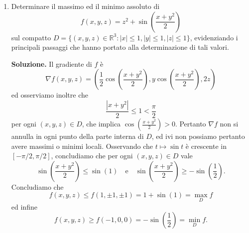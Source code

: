 \begin{enumerate}
	\textbf{Soluzione.}
		Calcoliamo le derivate parziali in $\operatorname{Int} E \subset \mathbb{R}^3$, ovvero
		\[
		\frac{\partial f}{\partial x} = 2x e^{x^2 + y^2 + z^2} \cos\left(e^{x^2 + y^2 + z^2}\right), \quad
		\frac{\partial f}{\partial y} = 2y e^{x^2 + y^2 + z^2} \cos\left(e^{x^2 + y^2 + z^2}\right),
		\]
		e $\frac{\partial f}{\partial z} = 2z e^{x^2 + y^2 + z^2} \cos\left(e^{x^2 + y^2 + z^2}\right)$. Per $(x,y,z) \in E$, vale
		\[
		1 \leq e^{x^2 + y^2 + z^2} \leq e^{\log(3\pi/4)} = \frac{3\pi}{4}.
		\]
		L'immagine di $E$ tramite $e^{x^2 + y^2 + z^2}$ è esattamente l'intervallo $[1, 3\pi/4]$. Quindi è sufficiente studiare $\sin(x)$ in tale intervallo. Notiamo che
		\[
		\frac{\pi}{4} < 1 < \frac{\pi}{2}
		\]
		e $\sin(x)$ è crescente in $[0, \pi/2]$, pertanto
		\[
		\sin\left(\frac{3\pi}{4}\right) = \sin\left(\frac{\pi}{4}\right) < \sin(1) < \sin\left(\frac{\pi}{2}\right) = 1.
		\]
		Quindi tutti i punti della sfera $\operatorname{Fr}(B(0, \sqrt{\log(\pi/2)}))$ sono di massimo assoluto per
		\[
		f(x,y,z) = \sin\left(e^{x^2 + y^2 + z^2}\right) \quad \text{su} \quad E
		\]
		ed infatti in tali punti, che sono interni ad $E$, il gradiente di $f$ si annulla. L'unico altro punto dove si annulla il gradiente è l'origine, che è un minimo locale in quanto
		\[
		f(0,0,0) = \sin(1) \leq \sin\left(e^{x^2 + y^2 + z^2}\right)
		\]
		per $(x,y,z) \in B(0, \sqrt{\log(\pi/2)})$. Per le disuguaglianze di~(1), il minimo assoluto è assunto nei punti di $\operatorname{Fr}(B(0, \sqrt{\log(3\pi/4)})) = \operatorname{Fr}(E)$. Abbiamo infine
		\[
		f(E) = \left[\frac{1}{\sqrt{2}}, 1\right].
		\]
		Si osservi che per avere immagine, minimi e massimi locali e globali bastava studiare la funzione
		\[
		\varphi(s) = \sin\left(e^s\right)
		\]
		sull'intervallo $\left[0, \log\left(\frac{3\pi}{4}\right)\right]$.

	
	\item Determinare il massimo ed il minimo assoluto di
	\[
	f(x,y,z) = z^2 + \sin\left(\frac{x + y^2}{2}\right)
	\]
	sul compatto $D = \{(x,y,z) \in \mathbb{R}^3 : |x| \leq 1, |y| \leq 1, |z| \leq 1\}$, evidenziando i principali passaggi che hanno portato alla determinazione di tali valori.

	\textbf{Soluzione.}
		Il gradiente di $f$ è
		\[
		\nabla f(x,y,z) = \left(\frac{1}{2} \cos\left(\frac{x + y^2}{2}\right), y \cos\left(\frac{x + y^2}{2}\right), 2z\right)
		\]
		ed osserviamo inoltre che
		\[
		\frac{|x + y^2|}{2} \leq 1 < \frac{\pi}{2}
		\]
		per ogni $(x,y,z) \in D$, che implica $\cos\left(\frac{x + y^2}{2}\right) > 0$. Pertanto $\nabla f$ non si annulla in ogni punto della parte interna di $D$, ed ivi non possiamo pertanto avere massimi o minimi locali. Osservando che $t \mapsto \sin t$ è crescente in $[-\pi/2, \pi/2]$, concludiamo che per ogni $(x,y,z) \in D$ vale
		\[
		\sin\left(\frac{x + y^2}{2}\right) \leq \sin(1) \quad \text{e} \quad \sin\left(\frac{x + y^2}{2}\right) \geq -\sin\left(\frac{1}{2}\right).
		\]
		Concludiamo che
		\[
		f(x,y,z) \leq f(1, \pm 1, \pm 1) = 1 + \sin(1) = \max_D f
		\]
		ed infine
		\[
		f(x,y,z) \geq f(-1,0,0) = -\sin\left(\frac{1}{2}\right) = \min_D f.
		\]


\end{enumerate}

